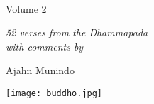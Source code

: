 
\cleartorecto
\thispagestyle{empty}

\vspace*{1em}

{\centering

\\[0.4\baselineskip]
Volume 2
\vspace*{3\baselineskip}

{\itshape 52 verses from the Dhammapada\\
with comments by}

\vspace*{2\baselineskip}
Ajahn Munindo

\vfill

\texttt{[image: buddho.jpg]}
\vspace*{1.3em}


}
